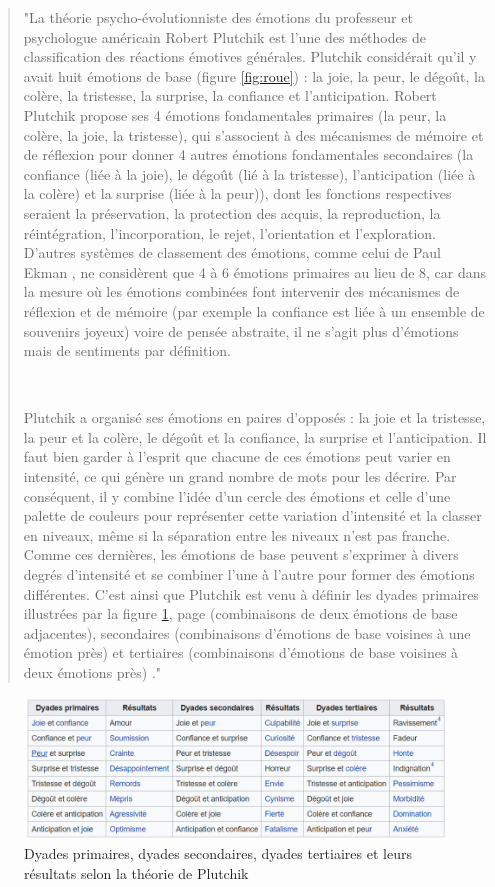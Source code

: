 \begin{quotation}

 "La théorie psycho-évolutionniste des émotions du professeur et psychologue américain Robert Plutchik \parencite{plutchik} est l'une des méthodes de classification des réactions émotives générales. Plutchik considérait qu'il y avait huit émotions de base (figure \ref{fig:roue}) : la joie, la peur, le dégoût, la colère, la tristesse, la surprise, la confiance et l'anticipation. Robert Plutchik propose ses 4 émotions fondamentales primaires (la peur, la colère, la joie, la tristesse), qui s'associent à des mécanismes de mémoire et de réflexion pour donner 4 autres émotions fondamentales secondaires (la confiance (liée à la joie), le dégoût (lié à la tristesse), l'anticipation (liée à la colère) et la surprise (liée à la peur)), dont les fonctions respectives seraient la préservation, la protection des acquis, la reproduction, la réintégration, l'incorporation, le rejet, l'orientation et l'exploration. D'autres systèmes de classement des émotions, comme celui de Paul Ekman \parencite{paul}, ne considèrent que 4 à 6 émotions primaires au lieu de 8, car dans la mesure où les émotions combinées font intervenir des mécanismes de réflexion et de mémoire (par exemple la confiance est liée à un ensemble de souvenirs joyeux) voire de pensée abstraite, il ne s'agit plus d'émotions mais de sentiments par définition.

~\par
Plutchik a organisé ses émotions en paires d'opposés : la joie et la tristesse, la peur et la colère, le dégoût et la confiance, la surprise et l'anticipation. Il faut bien garder à l'esprit que chacune de ces émotions peut varier en intensité, ce qui génère un grand nombre de mots pour les décrire. Par conséquent, il y combine l'idée d'un cercle des émotions et celle d'une palette de couleurs pour représenter cette variation d'intensité et la classer en niveaux, même si la séparation entre les niveaux n'est pas franche. Comme ces dernières, les émotions de base peuvent s'exprimer à divers degrés d'intensité et se combiner l'une à l'autre pour former des émotions différentes. C'est ainsi que Plutchik est venu à définir les dyades primaires illustrées par la figure \ref{fig:TbEm}, page \pageref{fig:TbEm} (combinaisons de deux émotions de base adjacentes), secondaires (combinaisons d'émotions de base voisines à une émotion près) et tertiaires (combinaisons d'émotions de base voisines à deux émotions près)   \parencite{tayari2009modelisation}."

\end{quotation}


\begin{figure}[th]
\hspace*{-1.9cm} 
\centering
\includegraphics{Figures/tableauEmotions.PNG}
\decoRule
\caption[Tableau de la théorie de Plutchik]{Dyades primaires, dyades secondaires, dyades tertiaires et leurs résultats selon la théorie de Plutchik}
\label{fig:TbEm}
\end{figure}




